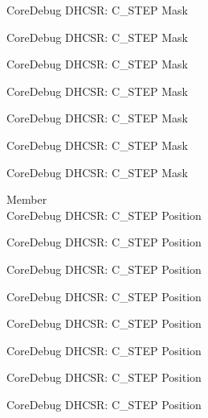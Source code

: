 \begin{DoxyRefList}
\label{deprecated__deprecated000783}%
%
Core\+Debug DHCSR\+: C\+\_\+\+STEP Mask 

\label{deprecated__deprecated000839}%
%
Core\+Debug DHCSR\+: C\+\_\+\+STEP Mask 

\label{deprecated__deprecated000922}%
%
Core\+Debug DHCSR\+: C\+\_\+\+STEP Mask 

\label{deprecated__deprecated000981}%
%
Core\+Debug DHCSR\+: C\+\_\+\+STEP Mask 

\label{deprecated__deprecated001057}%
%
Core\+Debug DHCSR\+: C\+\_\+\+STEP Mask 

\label{deprecated__deprecated001146}%
%
Core\+Debug DHCSR\+: C\+\_\+\+STEP Mask 

\label{deprecated__deprecated001248}%
%
Core\+Debug DHCSR\+: C\+\_\+\+STEP Mask  
\item[Member \doxylink{group___c_m_s_i_s___core_debug_gae1fc39e80de54c0339cbb1b298a9f0f9}{Core\+Debug\+\_\+\+DHCSR\+\_\+\+C\+\_\+\+STEP\+\_\+\+Pos} ]\hfill \\
\label{deprecated__deprecated000035}%
%
Core\+Debug DHCSR\+: C\+\_\+\+STEP Position 

\label{deprecated__deprecated000123}%
%
Core\+Debug DHCSR\+: C\+\_\+\+STEP Position 

\label{deprecated__deprecated000179}%
%
Core\+Debug DHCSR\+: C\+\_\+\+STEP Position 

\label{deprecated__deprecated000262}%
%
Core\+Debug DHCSR\+: C\+\_\+\+STEP Position 

\label{deprecated__deprecated000321}%
%
Core\+Debug DHCSR\+: C\+\_\+\+STEP Position 

\label{deprecated__deprecated000397}%
%
Core\+Debug DHCSR\+: C\+\_\+\+STEP Position 

\label{deprecated__deprecated000486}%
%
Core\+Debug DHCSR\+: C\+\_\+\+STEP Position 

\label{deprecated__deprecated000588}%
%
Core\+Debug DHCSR\+: C\+\_\+\+STEP Position 


\end{DoxyRefList}

